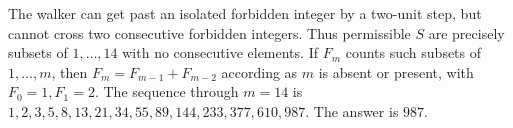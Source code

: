 The walker can get past an isolated forbidden integer by a two-unit step, but cannot cross two consecutive forbidden integers. Thus permissible $S$ are precisely subsets of $1,\ldots,14$ with no consecutive elements. If $F_m$ counts such subsets of $1,\ldots,m$, then $F_m=F_{m-1}+F_{m-2}$ according as $m$ is absent or present, with $F_0=1,F_1=2$. The sequence through $m=14$ is $1,2,3,5,8,13,21,34,55,89,144,233,377,610,987$. The answer is $\boxed{987}$.
